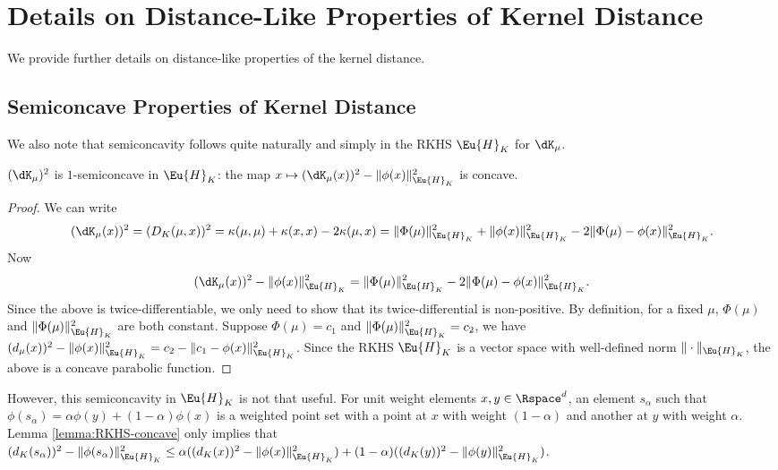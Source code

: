 \documentclass[11pt]{myclass}
\begin{document}







\newpage
\appendix













\section{Details on Distance-Like Properties of Kernel Distance}
\label{app:dist-like}

We provide further details on distance-like properties of the kernel distance.  

\subsection{Semiconcave Properties of Kernel Distance}


We also note that semiconcavity follows quite naturally and simply in the RKHS $\Eu{H}_K$ for $\dK_\mu$.  

\begin{lemma}
\label{lemma:RKHS-concave}
$(\dK_\mu)^2$ is $1$-semiconcave in $\Eu{H}_K$: the map $x \mapsto (\dK_\mu(x))^2 - \|\phi(x)\|_{\Eu{H}_K}^2$ is concave. 
\end{lemma}
\begin{proof}
We can write 
\[
(\dK_{\mu}(x))^2 = (D_K(\mu,x))^2 
= 
\kappa(\mu,\mu) + \kappa(x,x) - 2 \kappa(\mu,x)
=
\|\Phi(\mu)\|^2_{\Eu{H}_K} + \|\phi(x)\|^2_{\Eu{H}_K} - 2 \|\Phi(\mu) - \phi(x)\|^2_{\Eu{H}_K}.  
\]
Now 
\[
(\dK_\mu(x))^2 - \|\phi(x)\|_{\Eu{H}_K}^2 
=
\|\Phi(\mu)\|^2_{\Eu{H}_K} - 2 \|\Phi(\mu) - \phi(x)\|^2_{\Eu{H}_K}.  
\]
Since the above is twice-differentiable, we only need to show that its twice-differential is non-positive. 
By definition, for a fixed $\mu$, $\Phi(\mu)$ and $\|\Phi(\mu)\|^2_{\Eu{H}_K}$ are both constant. 
Suppose $\Phi(\mu) = c_1$ and $\|\Phi(\mu)\|^2_{\Eu{H}_K} = c_2$,
we have $(d_\mu(x))^2 - \|\phi(x)\|_{\Eu{H}_K}^2  = c_2 - \|c_1 - \phi(x)\|^2_{\Eu{H}_K}$.
Since the RKHS $\Eu{H}_K$ is a vector space with well-defined norm $\| \cdot \|_{\Eu{H}_K}$, 
the above is a concave parabolic function.  
\end{proof}

However, this semiconcavity in $\Eu{H}_K$ is not that useful. 
For unit weight elements $x,y \in \Rspace^d$, an element $s_\alpha$ such that $\phi(s_\alpha) = \alpha \phi(y) + (1-\alpha) \phi(x)$ is a weighted point set with a point at $x$ with weight $(1-\alpha)$ and another at $y$ with weight $\alpha$. 
Lemma \ref{lemma:RKHS-concave} only implies that 
$(d_K(s_\alpha))^2 - \|\phi(s_\alpha)\|^2_{\Eu{H}_K} \leq \alpha((d_K(x))^2 - \|\phi(x)\|^2_{\Eu{H}_K}) + (1-\alpha)((d_K(y))^2 - \|\phi(y)\|^2_{\Eu{H}_K})$.  
\end{document}
